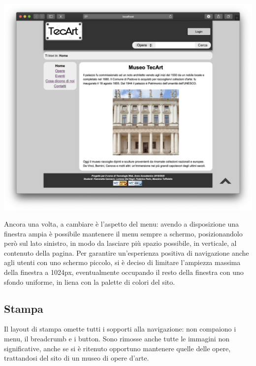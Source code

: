 \begin{center}
	\includegraphics[width=\textwidth]{img/Desktop-pres}
\end{center}
Ancora una volta, a cambiare è l'aspetto del menu: avendo a disposizione una finestra ampia è possibile mantenere il menu sempre a schermo, posizionandolo però sul lato sinistro, in modo da lasciare più spazio possibile, in verticale, al contenuto della pagina. Per garantire un'esperienza positiva di navigazione anche agli utenti con uno schermo piccolo, si è deciso di limitare l'ampiezza massima della finestra a 1024px, eventualmente occupando il resto della finestra con uno sfondo uniforme, in liena con la palette di colori del sito.


\subsection{Stampa}
\label{presentazione-stampa}


Il layout di stampa omette tutti i sopporti alla navigazione: non compaiono i menu, il breadcrumb e i button. Sono rimosse anche tutte le immagini non significative, anche se si è ritenuto opportuno mantenere quelle delle opere, trattandosi del sito di un museo di opere d'arte.
